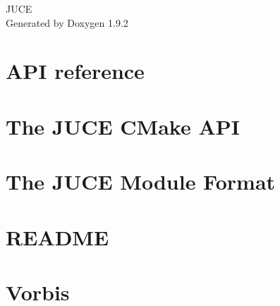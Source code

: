 \documentclass[twoside]{book}
\newcommand{\+}{\discretionary{\mbox{\scriptsize$\hookleftarrow$}}{}{}}
\newcommand{\clearemptydoublepage}{%
    \newpage{\pagestyle{empty}\cleardoublepage}%
  }
\begin{document}
  \raggedbottom
    \hypersetup{pageanchor=false,
                bookmarksnumbered=true,
                pdfencoding=unicode
               }
  \begin{titlepage}
  \vspace*{7cm}
  \begin{center}%
  {\Large JUCE}\\
  \vspace*{1cm}
  {\large Generated by Doxygen 1.9.2}\\
  \end{center}
  \end{titlepage}
  \clearemptydoublepage
  \tableofcontents
  \clearemptydoublepage
  \hypersetup{pageanchor=true}
\chapter{API reference}
\label{index}\hypertarget{index}{}
\chapter{The JUCE CMake API}
\label{md_build__c_make__a_p_i}

\chapter{The JUCE Module Format}
\label{md_build__j_u_c_e__module__format}

\chapter{README}
\label{md_build_juce_audio_devices_native_oboe__r_e_a_d_m_e}

\chapter{Vorbis}
\label{md_build_juce_audio_formats_codecs_oggvorbis_libvorbis_1_3_7__r_e_a_d_m_e}

\end{document}
